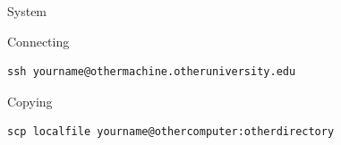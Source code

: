 \documentclass[11pt,headernav]{beamer}
\begin{document}

 {System}

\begin{numberedframe}{Connecting}
\begin{lstlisting}
ssh yourname@othermachine.otheruniversity.edu
\end{lstlisting}
\end{numberedframe}

\begin{numberedframe}{Copying}
\begin{lstlisting}
scp localfile yourname@othercomputer:otherdirectory
\end{lstlisting}
\end{numberedframe}
\end{document}
